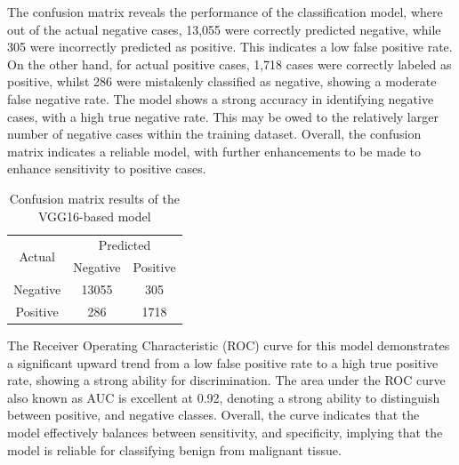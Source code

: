 \documentclass[../main]{subfiles}
\begin{document}
\noindent The confusion matrix reveals the performance of the classification model, where out of the actual negative cases, 13,055 were correctly predicted negative, while 305 were incorrectly predicted as positive. This indicates a low false positive rate. On the other hand, for actual positive cases, 1,718 cases were correctly labeled as positive, whilst 286 were mistakenly classified as negative, showing a moderate false negative rate. The model shows a strong accuracy in identifying negative cases, with a high true negative rate. This may be owed to the relatively larger number of negative cases within the training dataset. Overall, the confusion matrix indicates a reliable model, with further enhancements to be made to enhance sensitivity to positive cases.

\begin{table}[h]
    \centering
    \begin{tabular}{|c|c|c|}
        \hline
        \multirow{2}{*}{Actual} & \multicolumn{2}{c|}{Predicted} \\ \cline{2-3}
                                & Negative         & Positive         \\ \hline
        Negative                & 13055            & 305              \\ \hline
        Positive                & 286              & 1718              \\ \hline
    \end{tabular}
    \caption{Confusion matrix results of the VGG16-based model}
    \label{tab:confusion-matrix-vgg16}
\end{table}

\noindent The Receiver Operating Characteristic (ROC) curve for this model demonstrates a significant upward trend from a low false positive rate to a high true positive rate, showing a strong ability for discrimination. The area under the ROC curve also known as AUC is excellent at 0.92, denoting a strong ability to distinguish between positive, and negative classes. Overall, the curve indicates that the model effectively balances between sensitivity, and specificity, implying that the model is reliable for classifying benign from malignant tissue.
\end{document}
